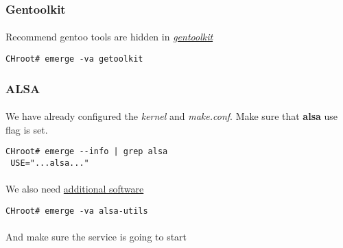 \documentclass[11pt,a4paper]{article}
\begin{document}
                    

                \newpage
                \subsubsection{Gentoolkit}

                    \paragraph{} Recommend gentoo tools are hidden in \href{https://wiki.gentoo.org/wiki/Gentoolkit}{\textit{gentoolkit}}

                    \begin{lstlisting}[style=BashInputCHRoot]
 CHroot# emerge -va getoolkit
                    \end{lstlisting}

                \newpage
                \subsubsection{ALSA}

                    \paragraph{} We have already configured the \textit{kernel} and \textit{make.conf}. Make sure that \textbf{alsa} use flag is set.

                    \begin{lstlisting}[style=BashInputCHRoot]
 CHroot# emerge --info | grep alsa
 USE="...alsa..."
                    \end{lstlisting}

                    \paragraph{} We also need \href{https://wiki.gentoo.org/wiki/ALSA#Software}{additional software}

                    \begin{lstlisting}[style=BashInputCHRoot]
 CHroot# emerge -va alsa-utils
                    \end{lstlisting}

                    \paragraph{} And make sure the service is going to start
\end{document}
